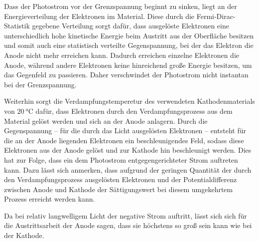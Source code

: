 Dass der Photostrom vor der Grenzspannung beginnt zu sinken, liegt an der Energieverteilung 
der Elektronen im Material. Diese durch die Fermi-Dirac-Statistik gegebene Verteilung sorgt 
dafür, dass ausgelöste Elektronen eine unterschiedlich hohe kinetische Energie beim Austritt 
aus der Oberfläche besitzen und somit auch eine statistisch verteilte Gegenspannung, bei der
das Elektron die Anode nicht mehr erreichen kann. Dadurch erreichen einzelne Elektronen die 
Anode, während andere Elektronen keine hinreichend große Energie besitzen, um das Gegenfeld
zu passieren. Daher verschwindet der Photostrom nicht instantan bei der Grenzspannung.

Weiterhin sorgt die Verdampfungstemperetur des verwendeten Kathodenmaterials von
$\SI{20}{\celsius}$ dafür, dass Elektronen durch den Verdampfungsprozess aus dem Material 
gelöst werden und sich an der Anode anlagern. Durch die Gegenspannung -- für die durch das 
Licht ausgelösten Elektronen -- entsteht für die an der Anode liegenden Elektronen 
ein beschleunigendes Feld, sodass diese Elektronen aus der Anode gelöst und  zur Kathode
hin beschleunigt werden. 
Dies hat zur Folge, dass ein dem Photostrom entgegengerichteter Strom auftreten kann.
Dazu lässt sich anmerken, dass aufgrund der geringen Quantität der durch den Verdampfungsprozess
ausgelösten Elektronen und der Potentialdifferenz zwischen Anode und Kathode der Sättigungswert
bei diesem umgekehrtem Prozess erreicht werden kann.

Da bei relativ langwelligem Licht der negative Strom auftritt, lässt sich sich für 
die Austrittsarbeit der Anode sagen, dass sie höchstens so groß sein kann wie bei der
Kathode.

